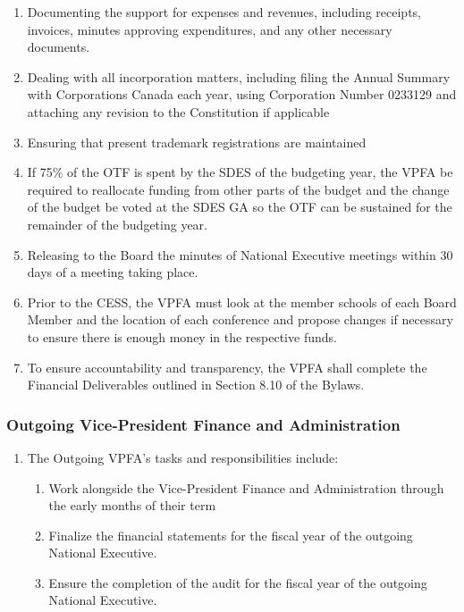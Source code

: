 \begin{enumerate}
\begin{enumerate}
    \begin{enumerate}
     \item
      Proposing amendments to this budget once the Board for the upcoming year is established.
    \end{enumerate}
   \item
    Documenting the support for expenses and revenues, including receipts, invoices, minutes approving expenditures, and any other necessary documents.
   \item
    Dealing with all incorporation matters, including filing the Annual Summary with Corporations Canada each year, using Corporation Number 0233129 and attaching any revision to the Constitution if applicable
   \item
    Ensuring that present trademark registrations are maintained
   \item
    If 75\% of the OTF is spent by the SDES of the budgeting year, the VPFA be required to reallocate funding from other parts of the budget and the change of the budget be voted at the SDES GA so the OTF can be sustained for the remainder of the budgeting year.
   \item
    Releasing to the Board the minutes of National Executive meetings within 30 days of a meeting taking place.
   \item
    Prior to the CESS, the VPFA must look at the member schools of each Board Member and the location of each conference and propose changes if necessary to ensure there is enough money in the respective funds.
   \item
    To ensure accountability and transparency, the VPFA shall complete the Financial Deliverables outlined in Section 8.10 of the Bylaws.
  \end{enumerate}
\end{enumerate}

\subsubsection{Outgoing Vice-President Finance and Administration}
\label{outgoing-vice-president-finance-and-administration}

\begin{enumerate}
 \item
  The Outgoing VPFA's tasks and responsibilities include:

  \begin{enumerate}
   \item
    Work alongside the Vice-President Finance and Administration through the early months of their term
   \item
    Finalize the financial statements for the fiscal year of the outgoing National Executive.
   \item
    Ensure the completion of the audit for the fiscal year of the outgoing National Executive.
  \end{enumerate}
\end{enumerate}

